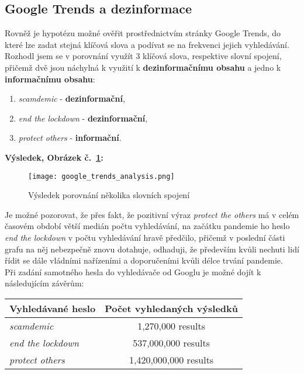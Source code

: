 \subsection{Google Trends a dezinformace}

Rovněž je hypotézu možné ověřit prostřednictvím stránky Google Trends, do které lze zadat stejná klíčová slova a podívat se na frekvenci jejich vyhledávání.\\

Rozhodl jsem se v porovnání využít 3 klíčová slova, respektive slovní spojení, přičemž dvě jsou náchylná k využití k \textbf{dezinformačnímu obsahu} a jedno k \textbf{informačnímu obsahu}:\\

\begin{enumerate}
\item \textit{scamdemic} - \textbf{dezinformační},
\item \textit{end the lockdown} - \textbf{dezinformační},
\item \textit{protect others} - \textbf{informační}.	
\end{enumerate}
\vspace*{5mm}

\newpage

\textbf{Výsledek, Obrázek č.~\ref{fig:google trends}:}

\begin{figure}[htbp]
  \centering
  \texttt{[image: google\_trends\_analysis.png]}
  \caption{Výsledek porovnání několika slovních spojení}
  \label{fig:google trends}
\end{figure}

Je možné pozorovat, že přes fakt, že pozitivní výraz \textit{protect the others} má v celém časovém období větší medián počtu vyhledávání, na začátku pandemie ho heslo \textit{end the lockdown} v počtu vyhledávání hravě předčilo, přičemž v poslední části grafu na něj nebezpečně znovu dotahuje, odhaduji, že především kvůli nechuti lidí řídit se dále vládními nařízeními a doporučeními kvůli délce trvání pandemie.\\

Při zadání samotného hesla do vyhledávače od Googlu je možné dojít k následujícím závěrům:\\

\begin{centering}
\begin{tabular}{l|c}
 \textbf{Vyhledávané heslo} & \textbf{Počet vyhledaných výsledků} \\ 
\hline
\hline
 \textit{scamdemic} & 1,270,000 results \\  
 \textit{end the lockdown} & 537,000,000 results \\
 \textit{protect others} & 1,420,000,000 results \\
\hline
\hline    
\end{tabular}
  \label{tbl:odkaz}
\end{centering}
\vspace*{5mm}


